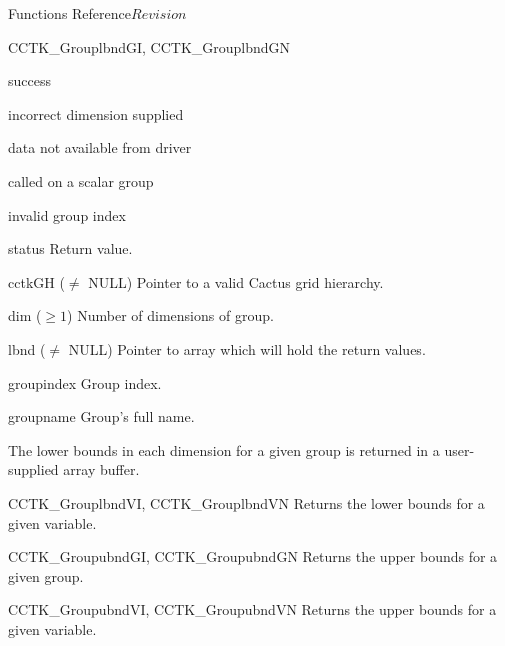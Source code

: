\begin{cactuspart}{ Functions Reference}{}{$Revision$}
\begin{FunctionDescription}{CCTK\_GrouplbndGI, CCTK\_GrouplbndGN}
\begin{ResultSection}
\begin{Result}{0} success \end{Result}
\begin{Result}{-1} incorrect dimension supplied \end{Result}
\begin{Result}{-2} data not available from driver \end{Result}
\begin{Result}{-3} called on a scalar group \end{Result}
\begin{Result}{-4} invalid group index \end{Result}
\end{ResultSection}

\begin{ParameterSection}
\begin{Parameter}{status} Return value. \end{Parameter}
\begin{Parameter}{cctkGH ($\ne$ NULL)} Pointer to a valid Cactus grid hierarchy. \end{Parameter}
\begin{Parameter}{dim ($\ge 1$)} Number of dimensions of group. \end{Parameter}
\begin{Parameter}{lbnd ($\ne$ NULL)} Pointer to array which will hold the return values. \end{Parameter}
\begin{Parameter}{groupindex} Group index. \end{Parameter}
\begin{Parameter}{groupname} Group's full name. \end{Parameter}
\end{ParameterSection}

\begin{Discussion}
The lower bounds in each dimension for a given group is returned in a user-supplied array buffer.
\end{Discussion}

\begin{SeeAlsoSection}
\begin{SeeAlso}{CCTK\_GrouplbndVI, CCTK\_GrouplbndVN}
Returns the lower bounds for a given variable.
\end{SeeAlso}
\begin{SeeAlso}{CCTK\_GroupubndGI, CCTK\_GroupubndGN}
Returns the upper bounds for a given group.
\end{SeeAlso}
\begin{SeeAlso}{CCTK\_GroupubndVI, CCTK\_GroupubndVN}
Returns the upper bounds for a given variable.
\end{SeeAlso}
\end{SeeAlsoSection}
\end{FunctionDescription}



\end{cactuspart}
